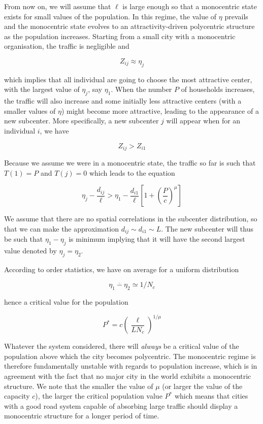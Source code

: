 From now on, we will assume that $\ell$ is large enough so that a
monocentric state exists for small values of the population. In this
regime, the value of $\eta$ prevails and the monocentric state evolves
to an attractivity-driven polycentric structure as the population
increases. 
Starting from a small city with a monocentric
organisation, the traffic is negligible and 

$$Z_{ij}\approx \eta_j$$

which implies that all individual are going to choose the most attractive
center, with the largest value of $\eta_j$, say $\eta_1$.
When the number $P$ of households increases, the traffic will also increase and
some initially less attractive centers (with a smaller values of $\eta$) might
become more attractive, leading to the appearance of a new subcenter. More specifically, a new
subcenter $j$ will appear when for an individual $i$, we have 

$$Z_{ij}>Z_{i1}$$

Because we assume we were in a monocentric state, the traffic so far is such
that $T(1)=P$ and $T(j)=0$ which leads to the equation

\begin{equation}
    \eta_j-\frac{d_{ij}}{\ell}>\eta_1-\frac{d_{i1}}{\ell}\left[1+\left(\frac{P}{c}\right)^\mu\right]
\end{equation}

We assume that there are no spatial correlations in the subcenter distribution,
so that we can make the approximation $d_{ij}\sim d_{i1}\sim L$. The new
subcenter will thus be such that $\eta_1-\eta_j$ is minimum implying that it
will have the second largest value denoted by $\eta_j=\eta_2$. 

According to order statistics, we have on average for a uniform distribution

$$\overline{\eta_1-\eta_2}\simeq 1/N_c$$

hence a critical value for the population

\begin{equation}
    \boxed{P^*= c \left( \frac{\ell}{L N_c} \right)^{1/\mu}}
    \label{eq:critical_population}
\end{equation}

Whatever the system considered, there will \emph{always} be a critical
value of the population above which the city becomes polycentric. The
monocentric regime is therefore fundamentally unstable with regards to
population increase, which is in agreement with the fact that no major city in
the world exhibits a monocentric structure. We note that the smaller the value
of $\mu$ (or larger the value of the capacity $c$), the larger the critical
population value $P^*$ which means that cities with a good road system capable
of absorbing large traffic should display a monocentric structure for a longer
period of time.

